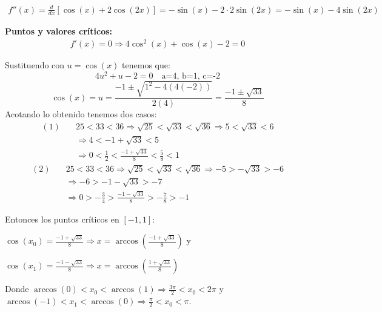 \documentclass[12pt]{article}
\begin{document}
\begin{enumerate}[\hspace{9px} a)]
        \begin{align*}
            f''(x) = \frac{d}{dx}[\cos(x) + 2\cos(2x)] = -\sin(x) - 2\cdot2\sin(2x) = -\sin(x) - 4\sin(2x)
        \end{align*}

    \textbf{Puntos y valores cr\'iticos: }
        \begin{align*}
            f'(x) = 0 \Longrightarrow 4\cos^2(x)+\cos(x)-2=0
        \end{align*}

        Sustituendo con \(u=\cos(x)\) tenemos que:
        \begin{equation*}
            4u^2+u-2=0 \quad \text{a=4, b=1, c=-2}
        \end{equation*}
        \begin{equation*}
            \cos(x) = u = \frac{-1\pm\sqrt{1^2-4(4(-2))}}{2(4)} = \frac{-1\pm\sqrt{33}}{8}
        \end{equation*}
        Acotando lo obtenido tenemos dos casos:
        \begin{align*}
            (1) \quad &25<33<36 \Longrightarrow \sqrt{25}<\sqrt{33}<\sqrt{36} \Longrightarrow 5<\sqrt{33}<6 \\
            &\Longrightarrow 4<-1+\sqrt{33}<5 \\
            &\Longrightarrow 0<\frac{1}{2}<\frac{-1+\sqrt{33}}{8}<\frac{5}{8}<1
        \end{align*}
        \begin{align*}
            (2) \quad &25<33<36 \Longrightarrow \sqrt{25}<\sqrt{33}<\sqrt{36} \Longrightarrow -5>-\sqrt{33}>-6 \\
            &\Longrightarrow -6>-1-\sqrt{33}>-7 \\
            &\Longrightarrow 0>-\frac{3}{4}>\frac{-1-\sqrt{33}}{8}>-\frac{7}{8}>-1
        \end{align*}

        Entonces los puntos cr\'iticos en \([-1,1]\): \medskip
        
        \(\cos(x_0)=\displaystyle\frac{-1+\sqrt{33}}{8} \Longrightarrow x = \arccos\left(\frac{-1+\sqrt{33}}{8}\right)\) y \medskip
        
        \(\cos(x_1)=\displaystyle\frac{-1-\sqrt{33}}{8} \Longrightarrow x = \arccos\left(\frac{1+\sqrt{33}}{8}\right)\)

        Donde \(\arccos(0)<x_0<\arccos(1) \Longrightarrow \frac{3\pi}{2}<x_0<2\pi\) y \(\arccos(-1)<x_1<\arccos(0) \Longrightarrow \frac{\pi}{2}<x_0<\pi\).


\end{enumerate}
\end{document}
